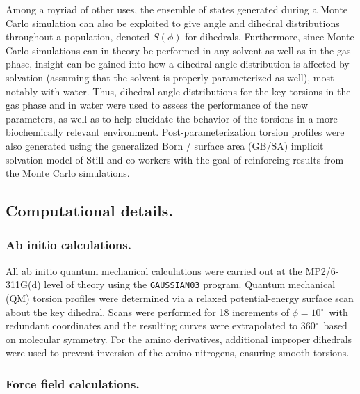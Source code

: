 \documentclass[12pt]{report}
\def\deg{$^{\circ}$}
\begin{document}
Among a myriad of other uses, the ensemble of states generated during a Monte Carlo simulation can also be exploited to give angle and dihedral distributions throughout a population, denoted $S(\phi)$ for dihedrals. Furthermore, since Monte Carlo simulations can in theory be performed in any solvent as well as in the gas phase, insight can be gained into how a dihedral angle distribution is affected by solvation (assuming that the solvent is properly parameterized as well), most notably with water. Thus, dihedral angle distributions for the key torsions in the gas phase and in water were used to assess the performance of the new parameters, as well as to help elucidate the behavior of the torsions in a more biochemically relevant environment. Post-parameterization torsion profiles were also generated using the generalized Born / surface area (GB/SA) implicit solvation model of Still and co-workers\cite{still,qiu} with the goal of reinforcing results from the Monte Carlo simulations.


\subsection{Computational details.}

\subsubsection{Ab initio calculations.}

All ab initio quantum mechanical calculations were carried out at the MP2/6-311G(d) level of theory using the {\tt GAUSSIAN03} program.\cite{gauss} Quantum mechanical (QM) torsion profiles were determined via a relaxed potential-energy surface scan about the key dihedral. Scans were performed for 18 increments of $\phi = 10$\deg\ with redundant coordinates and the resulting curves were extrapolated to 360\deg\ based on molecular symmetry. For the amino derivatives, additional improper dihedrals were used to prevent inversion of the amino nitrogens, ensuring smooth torsions.

\subsubsection{Force field calculations.}
\end{document}
